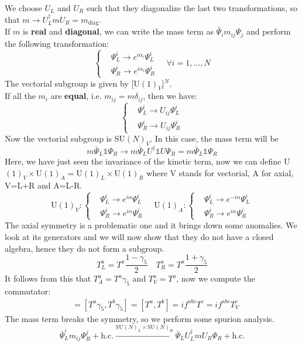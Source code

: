 \documentclass[../main.tex]{subfiles}
\begin{document}
We choose $U_L$ and $U_R$ such that they diagonalize the last two transformations, so that $m\to U_L^\dagger mU_R=m_{\text{diag}}$.\\
If $m$ is \textbf{real} and \textbf{diagonal}, we can write the mass term as $\bar{\Psi}_im_{ij}\Psi_j$ and perform the following transformation:
\[
\left\{
\begin{aligned}
&\Psi_L^i\to e^{i\alpha_i}\Psi_L^i\\
&\Psi_R^i\to e^{i\alpha_i}\Psi_R^i
\end{aligned}
\quad\forall i=1,\dots,N
\right.
\]
The vectorial subgroup is given by [U$(1)_V$]$^N$.\\
If all the $m_i$ are \textbf{equal}, i.e. $m_{ij}=m\delta_{ij}$, then we have:
\[
\left\{
\begin{aligned}
&\Psi_L^i\to U_{ij}\Psi_L^i\\
&\Psi_R^i\to U_{ij}\Psi_R^i
\end{aligned}
\right.
\]
Now the vectorial subgroup is SU$(N)_V$. In this case, the mass term will be
\[
m\bar{\Psi}_L\mathbb{1}\Psi_R\to m\bar{\Psi}_LU^\dagger\mathbb{1}U\Psi_R=m\bar{\Psi}_L\mathbb{1}\Psi_R
\]
Here, we have just seen the invariance of the kinetic term, now we can define U$(1)_V\times$U$(1)_A=$U$(1)_L\times$U$(1)_R$ where V stands for vectorial, A for axial, V=L+R and A=L-R. 
\[
\text{U}(1)_V:
\left\{
\begin{aligned}
&\Psi_L^i\to e^{i\alpha}\Psi_L^i\\
&\Psi_R^i\to e^{i\alpha}\Psi_R^i
\end{aligned}
\right.
\quad
\text{U}(1)_A:
\left\{
\begin{aligned}
&\Psi_L^i\to e^{-i\alpha}\Psi_L^i\\
&\Psi_R^i\to e^{i\alpha}\Psi_R^i
\end{aligned}
\right.
\]
The axial symmetry is a problematic one and it brings down some anomalies. We look at its generators and we will now show that they do not have a closed algebra, hence they do not form a subgroup. 
\[
T_L^a=T^a\frac{1-\gamma_5}{2} \quad T_R^a=T^a\frac{1+\gamma_5}{2}
\]
It follows from this that $T_A^a=T^a\gamma_5$ and $T_V^a=T^a$, now we compute the commutator:
\begin{align*}
[T_A^a,T_A^b]&=[T^a\gamma_5,T^b\gamma_5]=[T^a,T^b]=if^{abc}T^c=if^{abc}T_V^c
\end{align*}
The mass term breaks the symmetry, so we perform some spurion analysis.
\[
\bar{\Psi}_L^im_{ij}\Psi_R^j+\text{h.c.}\xrightarrow[]{\text{SU}(N)_L\times\text{SU}(N)_R}\bar{\Psi}_LU^\dagger_LmU_R\Psi_R+\text{h.c.}
\]
\end{document}
